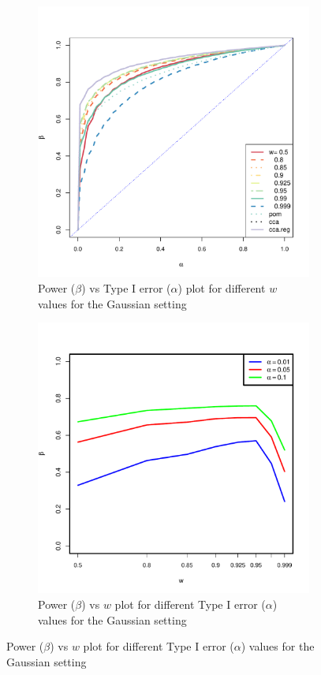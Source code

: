 \documentclass[11pt]{article} %
\begin{document}
\begin{figure}
 \centering
  \captionsetup[subfigure]{subrefformat=parens,labelformat=parens}
       
        \begin{subfigure}[b]{0.45\textwidth}        
           \includegraphics[scale=0.35]{MVN-FC-Tradeoff-OOS-c0.pdf}
\caption{Power ($\beta$) vs Type I error ($\alpha$) plot for different $w$ values for the Gaussian setting}
\label{fig:MVN-c0-power-alpha}
        \end{subfigure}%
         \begin{subfigure}[b]{0.45\textwidth}  
         \includegraphics[scale=0.95]{OOSMVN-power-w-c0.pdf}
\caption{Power ($\beta$) vs $w$ plot for different Type I error ($\alpha$) values for the Gaussian setting}
\label{fig:MVN-c001-power-w}
         \end{subfigure}%
          

\end{figure}
\end{document}
